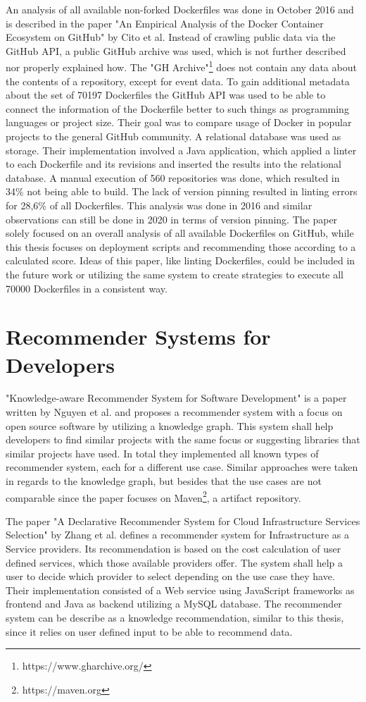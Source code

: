 An analysis of all available non-forked Dockerfiles was done in October 2016 and is described in the paper "An Empirical Analysis of the Docker Container Ecosystem on GitHub" by Cito et al. Instead of crawling public data via the GitHub API, a public GitHub archive was used, which is not further described nor properly explained how. The "GH Archive"\footnote{https://www.gharchive.org/} does not contain any data about the contents of a repository, except for event data. To gain additional metadata about the set of 70197 Dockerfiles the GitHub API was used to be able to connect the information of the Dockerfile better to such things as programming languages or project size. Their goal was to compare usage of Docker in popular projects to the general GitHub community. A relational database was used as storage. Their implementation involved a Java application, which applied a linter to each Dockerfile and its revisions and inserted the results into the relational database. A manual execution of 560 repositories was done, which resulted in 34\% not being able to build. The lack of version pinning resulted in linting errors for 28,6\% of all Dockerfiles. This analysis was done in 2016 and similar observations can still be done in 2020 in terms of version pinning. The paper solely focused on an overall analysis of all available Dockerfiles on GitHub, while this thesis focuses on deployment scripts and recommending those according to a calculated score. Ideas of this paper, like linting Dockerfiles, could be included in the future work or utilizing the same system to create strategies to execute all 70000 Dockerfiles in a consistent way.

\section{Recommender Systems for Developers}
\label{sec:rsfd}
"Knowledge-aware Recommender System for Software Development" is a paper written by Nguyen et al. and proposes a recommender system with a focus on open source software by utilizing a knowledge graph. This system shall help developers to find similar projects with the same focus or suggesting libraries that similar projects have used. In total they implemented all known types of recommender system, each for a different use case. Similar approaches were taken in regards to the knowledge graph, but besides that the use cases are not comparable since the paper focuses on Maven\footnote{https://maven.org}, a artifact repository.

The paper "A Declarative Recommender System for Cloud Infrastructure Services Selection" by Zhang et al. defines a recommender system for Infrastructure as a Service providers. Its recommendation is based on the cost calculation of user defined services, which those available providers offer. The system shall help a user to decide which provider to select depending on the use case they have. Their implementation consisted of a Web service using JavaScript frameworks as frontend and Java as backend utilizing a MySQL database. The recommender system can be describe as a knowledge recommendation, similar to this thesis, since it relies on user defined input to be able to recommend data.